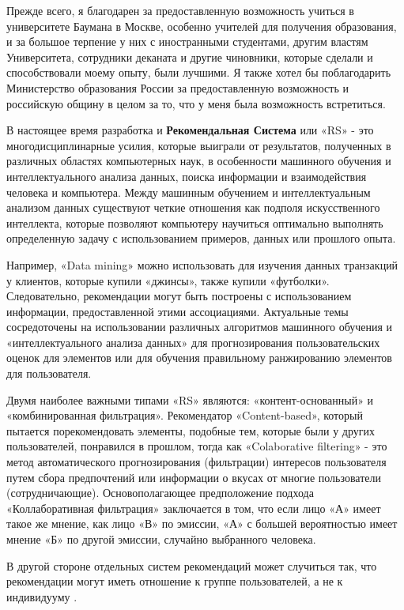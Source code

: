 \Introduction

Прежде всего, я благодарен за предоставленную возможность учиться в университете Баумана в Москве, особенно учителей  для получения образования, и за большое терпение у них с иностранными студентами, другим властям Университета, сотрудники деканата и другие чиновники, которые сделали и способствовали моему опыту, были лучшими. Я также хотел бы поблагодарить Министерство образования России за предоставленную возможность и российскую общину в целом за то, что у меня была возможность встретиться.

В настоящее время разработка и \textbf{Рекомендальная Система} или «RS» - это многодисциплинарные усилия, которые выиграли от результатов, полученных в различных областях компьютерных наук, в особенности машинного обучения и интеллектуального анализа данных, поиска информации и взаимодействия человека и компьютера. Между машинным обучением и интеллектуальным анализом данных существуют четкие отношения как подполя искусственного интеллекта, которые позволяют компьютеру научиться оптимально выполнять определенную задачу с использованием примеров, данных или прошлого опыта.

Например, «Data mining» \cite{data_mining}можно использовать для изучения данных транзакций у клиентов, которые купили «джинсы», также купили «футболки». Следовательно, рекомендации могут быть построены с использованием информации, предоставленной этими ассоциациями. Актуальные темы сосредоточены на использовании различных алгоритмов машинного обучения и «интеллектуального анализа данных» для прогнозирования пользовательских оценок для элементов или для обучения правильному ранжированию элементов для пользователя.

Двумя наиболее важными типами «RS» являются: «контент-основанный» и «комбинированная фильтрация». Рекомендатор «Content-based», который пытается порекомендовать элементы, подобные тем, которые были у других пользователей, понравился в прошлом, тогда как «Colaborative filtering» - это метод автоматического прогнозирования (фильтрации) интересов пользователя путем сбора предпочтений или информации о вкусах от многие пользователи (сотрудничающие). Основополагающее предположение подхода «Коллаборативная фильтрация» заключается в том, что если лицо «А» имеет такое же мнение, как лицо «В» по эмиссии, «А» с большей вероятностью имеет мнение «Б» по другой эмиссии, случайно выбранного человека.

В другой стороне отдельных систем рекомендаций может случиться так, что рекомендации могут иметь отношение к группе пользователей, а не к индивидууму \cite{porsuit}. 



